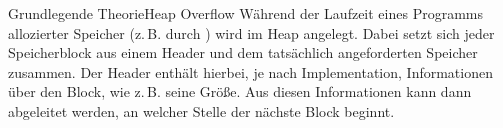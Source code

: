 \begin{frame}{Grundlegende Theorie}{Heap Overflow}
Während der Laufzeit eines Programms allozierter Speicher (z.\,B. durch ) wird im Heap angelegt. Dabei setzt sich
jeder Speicherblock aus einem Header und dem tatsächlich angeforderten Speicher zusammen. Der Header enthält hierbei,
je nach Implementation, Informationen über den Block, wie z.\,B. seine Größe. Aus diesen Informationen kann dann abgeleitet
werden, an welcher Stelle der nächste Block beginnt.
\end{frame}



